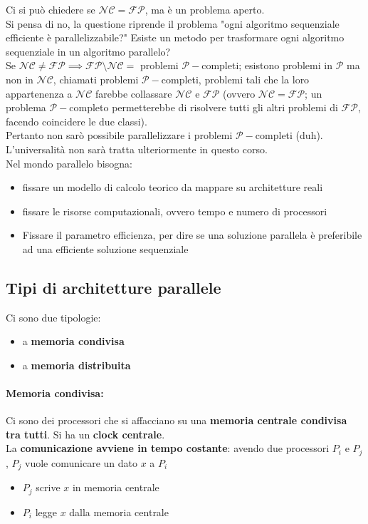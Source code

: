\documentclass[11pt]{article}
\begin{document}
	Ci si può chiedere se $\mathcal{NC} = \mathcal{FP}$, ma è un problema aperto.\\
	Si pensa di no, la questione riprende il problema "ogni algoritmo sequenziale efficiente è parallelizzabile?" Esiste un metodo per trasformare ogni algoritmo sequenziale in un algoritmo parallelo?\\
	
	Se $\mathcal{NC} \neq \mathcal{FP} \implies \mathcal{FP} \setminus \mathcal{NC} = $ problemi $\mathcal{P}-$completi; esistono problemi in $\mathcal{P}$ ma non in $\mathcal{NC}$, chiamati problemi $\mathcal{P}-$completi, problemi tali che la loro appartenenza a $\mathcal{NC}$ farebbe collassare $\mathcal{NC}$ e $\mathcal{FP}$ (ovvero $\mathcal{NC} = \mathcal{FP}$; un problema $\mathcal{P}-$completo permetterebbe di risolvere tutti gli altri problemi di $\mathcal{FP}$, facendo coincidere le due classi).\\
	
	Pertanto non sarò possibile parallelizzare i problemi $\mathcal{P}-$completi (duh).\\
	L'universalità non sarà tratta ulteriormente in questo corso.\\
	

	Nel mondo parallelo bisogna: 
	\begin{itemize}
		\item fissare un modello di calcolo teorico da mappare su architetture reali
		\item fissare le risorse computazionali, ovvero tempo e numero di processori 
		\item Fissare il parametro efficienza, per dire se una soluzione parallela è preferibile ad una efficiente soluzione sequenziale 
	\end{itemize}
	
	\newpage
	
	\subsection{Tipi di architetture parallele}
	Ci sono due tipologie:
	\begin{itemize}
		\item a \textbf{memoria condivisa}
		\item a \textbf{memoria distribuita}
	\end{itemize}
	
	\paragraph{Memoria condivisa:} Ci sono dei processori che si affacciano su una \textbf{memoria centrale condivisa tra tutti}. Si ha un \textbf{clock centrale}.\\
	La \textbf{comunicazione avviene in tempo costante}: avendo due processori $P_i$ e $P_j$, $P_j$ vuole comunicare un dato $x$ a $P_i$
	\begin{itemize}
		\item $P_j$ scrive $x$ in memoria centrale
		\item $P_i$ legge $x$ dalla memoria centrale
	\end{itemize}
\end{document}
